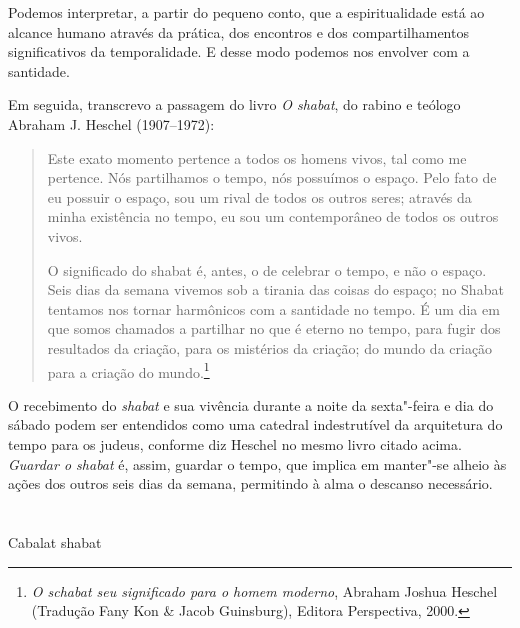 Podemos interpretar, a partir do pequeno conto, que a espiritualidade
está ao alcance humano através da prática, dos encontros e dos
compartilhamentos significativos da temporalidade. E desse modo podemos nos
envolver com a santidade.

Em seguida, transcrevo a passagem do livro \emph{O shabat}, do rabino e teólogo 
Abraham J. Heschel (1907--1972):

\begin{quote}
{Este exato momento pertence a todos os homens vivos, tal como me
pertence. Nós partilhamos o tempo, nós possuímos o espaço. Pelo fato de
eu possuir o espaço, sou um rival de todos os outros seres; através da
minha existência no tempo, eu sou um contemporâneo de todos os outros
vivos.}

{O significado do shabat é, antes, o de celebrar o tempo, e não o
espaço. Seis dias da semana vivemos sob a tirania das coisas do espaço;
no Shabat tentamos nos tornar harmônicos com a santidade no tempo. É um
dia em que somos chamados a partilhar no que é eterno no tempo, para
fugir dos resultados da criação, para os mistérios da criação; do mundo
da criação para a criação do mundo.}\footnote{\emph{O schabat 
	seu significado para o homem moderno}, Abraham Joshua Heschel 
	(Tradução Fany Kon \& Jacob Guinsburg), Editora Perspectiva, 2000.}
\end{quote}

O recebimento do \emph{shabat} e sua vivência durante a noite da sexta"-feira e
dia do sábado podem ser entendidos como uma catedral indestrutível da
arquitetura do tempo para os judeus, conforme diz Heschel no mesmo livro
citado acima. \emph{Guardar o shabat} é, assim, guardar o tempo, que implica em
manter"-se alheio às ações dos outros seis dias da semana, permitindo à
alma o descanso necessário.


\chapter*{}
\begin{center}
\begin{vplace}[0.3]
\Large
Cabalat shabat
\end{vplace}
\end{center}
\thispagestyle{empty}


\movetoevenpage
\raggedleft

\vspace*{1cm}

